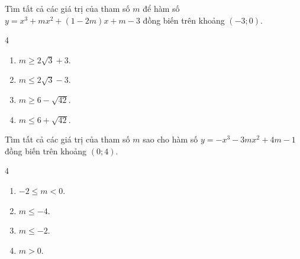 \begin{baitap}
	Tìm tất cả các giá trị của tham số $m$ để hàm số $y = x^3 + mx^2 + (1 - 2m)x + m - 3$ đồng biến trên khoảng $(-3;0)$.
	\begin{multicols}{4}
		\begin{enumerate}[\quad \bf A.]
			\item $m \ge 2\sqrt{3} + 3$.
			\item $m \le 2\sqrt{3} - 3$.
			\item $m \ge 6 - \sqrt{42}$.
			\item $m \le 6 + \sqrt{42}$.
		\end{enumerate}
	\end{multicols}
\end{baitap}

\begin{baitap}
	Tìm tất cả các giá trị của tham số $m$ sao cho hàm số $y = -x^3 - 3mx^2 + 4m - 1$ đồng biến trên khoảng $(0;4)$.
	\begin{multicols}{4}
		\begin{enumerate}[\quad \bf A.]
			\item $-2 \le m < 0$.
			\item $m \le -4$.
			\item $m \le -2$.
			\item $m > 0$.
		\end{enumerate}
	\end{multicols}
\end{baitap}



